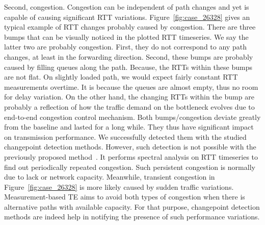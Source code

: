 Second, congestion. 
Congestion can be independent of path changes and yet is capable of causing significant RTT variations.
Figure~\ref{fig:case_26328} gives an typical example of RTT changes probably caused by congestion.
There are three bumps that can be visually noticed in the plotted RTT timeseries.
We say the latter two are probably congestion.
First, they do not correspond to any path changes, at least in the forwarding direction.
Second, these bumps are probably caused by filling queues along the path.
Because, the RTTs within these bumps are not flat.
On slightly loaded path, we would expect fairly constant RTT measurements overtime.
It is because the queues are almost empty, thus no room for delay variation.
On the other hand, the changing RTTs within the bump are probably a reflection of how the traffic demand on the bottleneck evolves due to end-to-end congestion control mechanism.
Both bumps/congestion deviate greatly from the baseline and lasted for a long while.
They thus have significant impact on transmission performance.
We successfully detected them with the studied changepoint detection methods.
However, such detection is not possible with the previously proposed method~\cite{Luckie2014}.
It performs spectral analysis on RTT timeseries to find out periodically repeated congestion.
Such persistent congestion is normally due to lack or network capacity.
Meanwhile, transient congestion in Figure~\ref{fig:case_26328} is more likely caused by sudden traffic variations.
Measurement-based TE aims to avoid both types of congestion when there is alternative paths with available capacity.
For that purpose, changepoint detection methods are indeed help in notifying the presence of such performance variations. 

